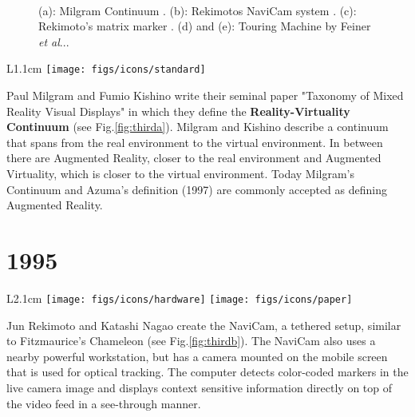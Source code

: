 \documentclass[12pt,a4paper]{article}
\makeatletter
\DeclareRobustCommand\onedot{\futurelet\@let@token\@onedot}
\def\@onedot{\ifx\@let@token.\else.\null\fi\xspace}
\def\etal{\emph{et al}\onedot}
\makeatother
\begin{document}
\begin{figure}[tbp]
\centering
\vspace{-50pt}
 \hfill
{} \\
 \hfill
{} \hfill
{}
\vspace{-10pt}
\caption{(a): Milgram Continuum \cite{Milgram94}. (b): Rekimotos NaviCam system \cite{Rekimoto95}. (c): Rekimoto's matrix marker \cite{Rekimoto96}. (d) and (e): Touring Machine by Feiner \etal \cite{Feiner97}.} \label{fig:third}
\end{figure}

\vspace{0.1in}

\begin{wrapfigure}{L}{1.1cm}
	\vspace{-10pt}	
	\texttt{[image: figs/icons/standard]}
	\vspace{-15pt}		
\end{wrapfigure}
\noindent Paul Milgram and Fumio Kishino write their seminal paper "Taxonomy of Mixed Reality Visual Displays" in which they define the \textbf{Reality-Virtuality Continuum} \cite{Milgram94} (see Fig.\ref{fig:thirda}). Milgram and Kishino describe a continuum that spans from the real environment to the virtual environment. In between there are Augmented Reality, closer to the real environment and Augmented Virtuality, which is closer to the virtual environment. Today Milgram's Continuum and Azuma's definition (1997) are commonly accepted as defining Augmented Reality.

\vspace{-5pt}
\section*{1995}
\begin{wrapfigure}{L}{2.1cm}
	\vspace{-10pt}	
	\texttt{[image: figs/icons/hardware]}
	\texttt{[image: figs/icons/paper]}	
	\vspace{-20pt}		
\end{wrapfigure}
Jun Rekimoto and Katashi Nagao create the NaviCam, a tethered setup, similar to Fitzmaurice's Chameleon \cite{Rekimoto95} (see Fig.\ref{fig:thirdb}). The NaviCam also uses a nearby powerful workstation, but has a camera mounted on the mobile screen that is used for optical tracking. The computer detects color-coded markers in the live camera image and displays context sensitive information directly on top of the video feed in a see-through manner.
\end{document}
